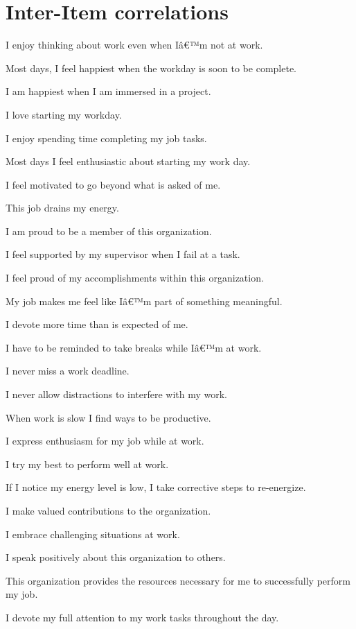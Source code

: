 \documentclass[
]{book}
\begin{document}
\hypertarget{inter-item-correlations}{%
\section{Inter-Item correlations}\label{inter-item-correlations}}

I enjoy thinking about work even when Iâ€™m not at work.

Most days, I feel happiest when the workday is soon to be complete.

I am happiest when I am immersed in a project.

I love starting my workday.

I enjoy spending time completing my job tasks.

Most days I feel enthusiastic about starting my work day.

I feel motivated to go beyond what is asked of me.

This job drains my energy.

I am proud to be a member of this organization.

I feel supported by my supervisor when I fail at a task.

I feel proud of my accomplishments within this organization.

My job makes me feel like Iâ€™m part of something meaningful.

I devote more time than is expected of me.

I have to be reminded to take breaks while Iâ€™m at work.

I never miss a work deadline.

I never allow distractions to interfere with my work.

When work is slow I find ways to be productive.

I express enthusiasm for my job while at work.

I try my best to perform well at work.

If I notice my energy level is low, I take corrective steps to re-energize.

I make valued contributions to the organization.

I embrace challenging situations at work.

I speak positively about this organization to others.

This organization provides the resources necessary for me to successfully perform my job.

I devote my full attention to my work tasks throughout the day.
\end{document}
